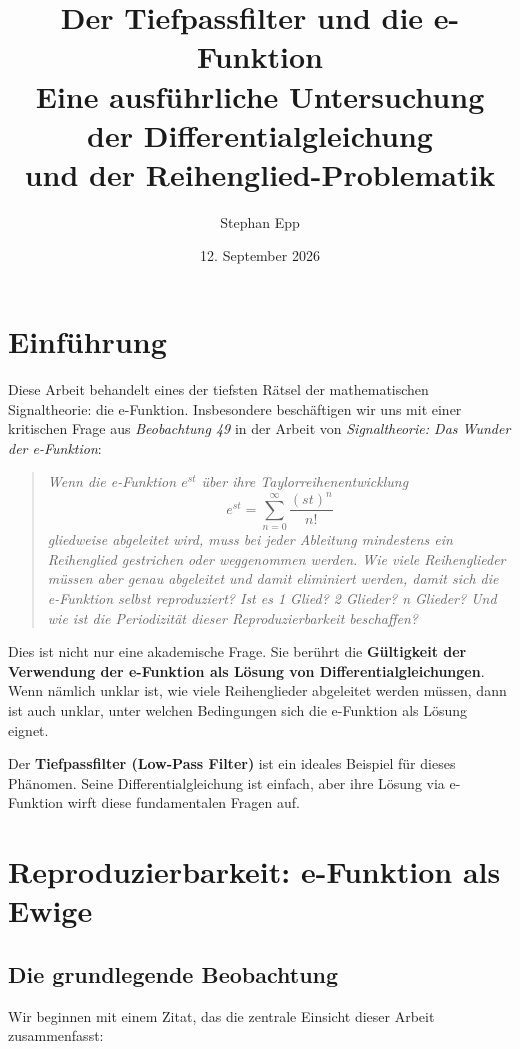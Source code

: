 \documentclass[a4paper,12pt,twoside]{report}
\title{\textbf{Der Tiefpassfilter und die e-Funktion} \\ 
{\Large Eine ausführliche Untersuchung der Differentialgleichung \\ und der Reihenglied-Problematik}}
\author{Stephan Epp}
\date{12. September 2026}
\theoremstyle{definition}
\begin{document}
	
\maketitle

\tableofcontents

\newpage

\section{Einführung}
	
Diese Arbeit behandelt eines der tiefsten Rätsel der mathematischen Signaltheorie: die e-Funktion. Insbesondere beschäftigen wir uns mit einer kritischen Frage aus \textit{Beobachtung 49} in der Arbeit von \cite{epp_signal} \textit{Signaltheorie: Das Wunder der e-Funktion}:

\begin{quote}
	\textit{Wenn die e-Funktion $e^{st}$ über ihre Taylorreihenentwicklung 
	$$e^{st} = \sum_{n=0}^{\infty} \frac{(st)^n}{n!}$$
	gliedweise abgeleitet wird, muss bei jeder Ableitung mindestens ein Reihenglied gestrichen oder weggenommen werden. Wie viele Reihenglieder müssen aber genau abgeleitet und damit eliminiert werden, damit sich die e-Funktion selbst reproduziert? Ist es 1 Glied? 2 Glieder? n Glieder? Und wie ist die Periodizität dieser Reproduzierbarkeit beschaffen?}
\end{quote}

Dies ist nicht nur eine akademische Frage. Sie berührt die \textbf{Gültigkeit der Verwendung der e-Funktion als Lösung von Differentialgleichungen}. Wenn nämlich unklar ist, wie viele Reihenglieder abgeleitet werden müssen, dann ist auch unklar, unter welchen Bedingungen sich die e-Funktion als Lösung eignet.

Der \textbf{Tiefpassfilter (Low-Pass Filter)} ist ein ideales Beispiel für dieses Phänomen. Seine Differentialgleichung ist einfach, aber ihre Lösung via e-Funktion wirft diese fundamentalen Fragen auf.	

\section{Reproduzierbarkeit: e-Funktion als Ewige}

\subsection{Die grundlegende Beobachtung}

Wir beginnen mit einem Zitat, das die zentrale Einsicht dieser Arbeit zusammenfasst:
\end{document}
